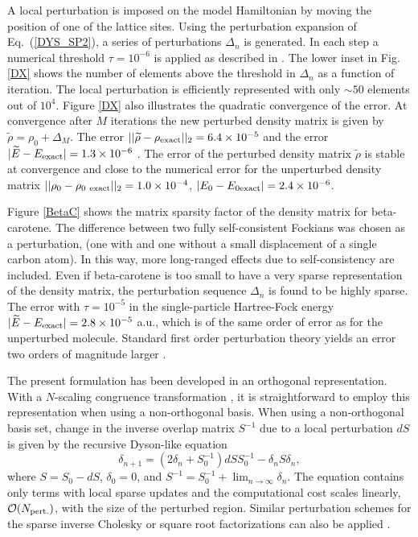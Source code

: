 A local perturbation is imposed on the model Hamiltonian
by moving the position of one of the lattice sites.
Using the perturbation expansion of Eq.\ (\ref{DYS_SP2}),
a series of perturbations $\Delta_n$ is generated. In each 
step a numerical threshold $\tau = 10^{-6}$ is applied as described in
\cite{NiklassonSP4}.  The lower inset in Fig.  \ref{DX} shows 
the number of elements above the threshold in $\Delta_n$ 
as a function of iteration. The local perturbation
is efficiently represented with only $\sim 50$ elements out of $10^4$.
Figure \ref{DX} also illustrates the quadratic convergence
of the error.  At convergence after 
$M$ iterations the new perturbed density matrix is given by
${\widetilde \rho} = \rho_0 + \Delta_M$. The error 
$||{\widetilde \rho} - \rho_{\rm exact}||_2 = 6.4 \times 10^{-5}$
and the error $|{\widetilde E} - E_{\rm exact}| = 1.3 \times 10^{-6}$
\cite{first_order}.  The error of the perturbed density matrix 
${\widetilde \rho}$ is stable at convergence and close to the numerical error 
for the unperturbed density matrix 
$||\rho_0 - \rho_{0\rm ~exact}||_2 = 1.0 \times 10^{-4}$,
$|{E}_0 - E_{0 \rm exact}| = 2.4 \times 10^{-6}$.

Figure \ref{BetaC} shows the matrix sparsity factor of the
density matrix for beta-carotene. The difference between two fully 
self-consistent Fockians was chosen as a perturbation, 
(one with and one without a small displacement of a single carbon atom). 
In this way, more long-ranged effects due 
to self-consistency are included. Even if beta-carotene
is too small to have a very sparse representation of the density matrix, 
the perturbation sequence $\Delta_n$ is found to be highly sparse.
The error with $\tau = 10^{-5}$ in the single-particle Hartree-Fock energy 
$|{\widetilde E} - E_{\rm exact}| = 2.8 \times 10^{-5}$ a.u., which is of the
same order of error as for the unperturbed molecule. Standard first
order perturbation theory yields an error two orders of magnitude 
larger \cite{first}.

The present formulation has been developed in an orthogonal representation.  With 
a $N$-scaling congruence transformation \cite{Challa99},  it is straightforward to 
employ this representation when using a non-orthogonal basis. When using a 
non-orthogonal basis set, change in the inverse overlap matrix  $S^{-1}$  due to
a local perturbation $dS$ is given by the recursive Dyson-like equation \cite{unpubl} 
\begin{equation}
\delta_{n+1} = (2\delta_n +  S_0^{-1}) dS S_0^{-1}
 - \delta_n S \delta_n,
\end{equation}
where $S = S_0 - dS$, $\delta_0 = 0$, and
$S^{-1} = S_0^{-1}+\lim_{n \rightarrow \infty} \delta_n$.
The equation contains only terms with local sparse updates 
and the computational cost scales linearly, ${\cal O}(N_{\rm pert.})$,
with the size of the perturbed region. Similar perturbation schemes 
for the sparse inverse Cholesky or square root factorizations can also 
be applied \cite{unpubl}.

